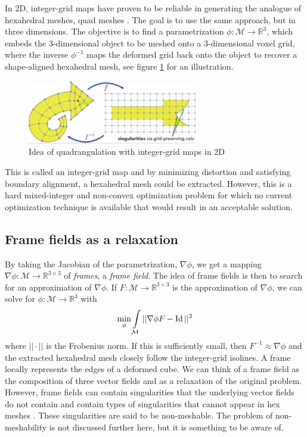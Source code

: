 \documentclass[../thesis.tex]{subfiles}
\begin{document}
In 2D, integer-grid maps have proven to be reliable
in generating the analogue of hexahedral meshes, quad meshes \cite{integer-grid}.
The goal is to use the same approach, but in three dimensions.
The objective is to find a parametrization
$\phi : \mathcal{M} \to \mathbb{R}^3$, which embeds the $3$-dimensional object
to be meshed
onto a $3$-dimensional voxel grid, where the inverse $\phi^{-1}$ maps the deformed
grid back onto the object to recover a shape-aligned hexahedral mesh, see figure \ref{fig:integer-grid} for an illustration.
\begin{figure}[htb]
  \centering
  \includegraphics[width=20em]{figures/integer-grid-rough}
  \caption{Idea of quadrangulation with integer-grid maps in 2D}
  \label{fig:integer-grid}
\end{figure}
This is called an integer-grid map and by minimizing distortion and satisfying boundary alignment,
a hexahedral mesh could be extracted.
However, this is a hard mixed-integer and non-convex optimization problem for which no current
optimization technique is available that would result in an acceptable solution.

\subsection{Frame fields as a relaxation}
By taking the Jacobian of the parametrization, $\nabla \phi$, we get a mapping
$\nabla \phi : \mathcal{M} \to \mathbb{R}^{3\times3}$ of \emph{frames}, a \emph{frame field}.
The idea of frame fields is then to search for an approximation of $\nabla \phi$.
If $F: \mathcal{M} \to \mathbb{R}^{3\times3}$ is the approximation of $\nabla \phi$, we can
solve for $\phi : \mathcal{M} \to \mathbb{R}^3$ with
$$\min \limits_{\phi} \int \limits_{\mathcal{M}} ||\nabla \phi F - \operatorname{Id}||^2$$
where $||\cdot||$ is the Frobenius norm. If this is sufficiently small, then $F^{-1} \approx \nabla \phi$ and 
the extracted hexahedral mesh closely follow the integer-grid isolines.
A frame locally represents the edges of a deformed cube.
We can think of a frame field as the composition of three vector fields
and as a relaxation of the original problem. However, frame fields
can contain singularities that the underlying vector fields do not contain \cite{Nieser}
and contain types of singularities that cannot appear in hex meshes \cite{Liu}.
These singularities are said to be non-meshable.
The problem of non-meshability is not discussed further here, but it
is something to be aware of.
\end{document}

